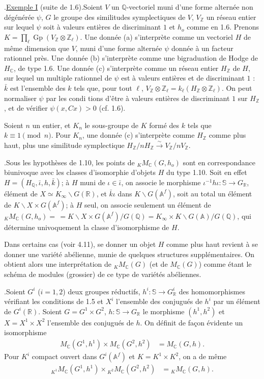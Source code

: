 \documentclass[10pt]{article}
\newcommand{\A}{\mathbb A}
\newcommand{\Af}{\mathbb A^f}
\newcommand{\C}{\mathbb C}
\newcommand{\Q}{\mathbb Q}
\newcommand{\R}{\mathbb R}
\newcommand{\Z}{\mathbb Z}
\newcommand{\bS}{\mathbb S}
\newcommand{\Gp}{\operatorname{Gp}}
\newcommand{\MC}{M_{\C}}
\begin{document}
.\quad \uline{Exemple I} (suite de 1.6).\quad Soient $V$ un $\Q$-vectoriel muni d'une forme alternée non dégénérée $\psi$, $G$ le groupe des similitudes symplectiques de $V$, $V_\Z$ un réseau entier sur lequel $\psi$ soit à valeurs entières de discriminant $1$ et $h_o$ comme en 1.6. Prenons $K=\prod_\ell \Gp(V_\Z\otimes\Z_\ell)$. Une donnée (a) s'interprète comme un vectoriel $H$ de même dimension que $V$, muni d'une forme alternée $\psi$ donnée à un facteur rationnel près. Une donnée (b) s'interprète comme une bigraduation de Hodge de $H_\C$, de type 1.6. Une donnée (c) s'interprète comme un réseau entier $H_\Z$ de $H$, sur lequel un multiple rationnel de $\psi$ est à valeurs entières et de discriminant $1$ : $\bar k$ est l'ensemble des $k$ tels que, pour tout $\ell$, $V_\Z\otimes\Z_\ell=k_\ell(H_\Z\otimes\Z_\ell)$. On peut normaliser $\psi$ par les condi%
tions d'être à valeurs entières de discriminant $1$ sur $H_\Z$, et de vérifier $\psi(x,Cx)>0$ (cf. 1.6).

Soient $n$ un entier, et $K_n$ le sous-groupe de $K$ formé des $k$ tels que $k\equiv1\pmod n$. Pour $K_n$, une donnée (c) s'interprète comme $H_\Z$ comme plus haut, plus une similitude symplectique $H_\Z/nH_\Z\xrightarrow{\sim}V_\Z/nV_\Z$.

.\quad Sous les hypothèses de 1.10, les points de ${}_K\MC(G,h_o)$ sont en correspondance biunivoque avec les classes d'isomorphie d'objets $H$ du type 1.10. Soit en effet $H=(H_\Q,\bar\iota,h,\bar k)$; à $H$ muni de $\iota\in\bar\iota$, on associe le morphisme $\iota^{-1}h\iota:\bS\to G_\R$, élément de $X\simeq K_\infty\backslash G(\R)$, et $\bar k\iota$ dans $K\backslash G(\Af)$, soit au total un élément de $K\backslash X\times G(\Af)$; à $H$ seul, on associe seulement un élément de ${}_K\MC(G,h_o)=\,=K\backslash X\times G(\Af)/G(\Q)=K_\infty\times K\backslash G(\A)/G(\Q)$, qui détermine univoquement la classe d'isomorphisme de $H$.

Dans certains cas (voir 4.11), se donner un objet $H$ comme plus haut revient à se donner une variété abélienne, munie de quelques structures supplémentaires. On obtient alors une interprétation de ${}_K\MC(G)$ (et de $\MC(G)$) comme étant le schéma de modules (grossier) de ce type de variétés abéliennes.

.\quad Soient $G^i$ ($i=1,2$) deux groupes réductifs, $h^i:\bS\to G^i_\R$ des homomorphismes vérifiant les conditions de 1.5 et $X^i$ l'ensemble des conjugués de $h^i$ par un élément de $G^i(\R)$. Soient $G=G^1\times G^2$, $h:\bS\to G_\R$ le morphisme $(h^1,h^2)$ et $X=X^1\times X^2$ l'ensemble des conjugués de $h$. On définit de façon évidente un isomorphisme
\begingroup
\makeatletter
\tagsleft@true
\makeatother
\begin{align}
\MC(G^1,h^1)\times\MC(G^2,h^2)&=\MC(G,h). \tag{1.13.1}
\end{align}
\endgroup
Pour $K^i$ compact ouvert dans $G^i(\Af)$ et $K=K^1\times K^2$, on a de même
\begingroup
\makeatletter
\tagsleft@true
\makeatother
\begin{align}
{}_{K^1}\MC(G^1,h^1)\times{}_{K^2}\MC(G^2,h^2)&={}_K\MC(G,h). \tag{1.13.2}
\end{align}
\endgroup
\end{document}
